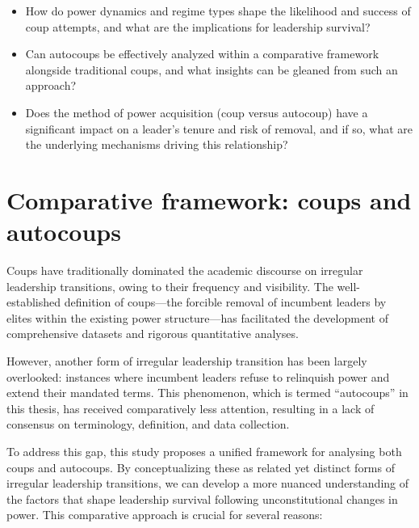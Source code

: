 \documentclass[
  12pt,
]{report}
\begin{document}
\begin{itemize}
\item
  How do power dynamics and regime types shape the likelihood and
  success of coup attempts, and what are the implications for leadership
  survival?
\item
  Can autocoups be effectively analyzed within a comparative framework
  alongside traditional coups, and what insights can be gleaned from
  such an approach?
\item
  Does the method of power acquisition (coup versus autocoup) have a
  significant impact on a leader's tenure and risk of removal, and if
  so, what are the underlying mechanisms driving this relationship?
\end{itemize}

\section{Comparative framework: coups and
autocoups}\label{comparative-framework-coups-and-autocoups}

Coups have traditionally dominated the academic discourse on irregular
leadership transitions, owing to their frequency and visibility. The
well-established definition of coups---the forcible removal of incumbent
leaders by elites within the existing power structure---has facilitated
the development of comprehensive datasets and rigorous quantitative
analyses.

However, another form of irregular leadership transition has been
largely overlooked: instances where incumbent leaders refuse to
relinquish power and extend their mandated terms. This phenomenon, which
is termed ``autocoups'' in this thesis, has received comparatively less
attention, resulting in a lack of consensus on terminology, definition,
and data collection.

To address this gap, this study proposes a unified framework for
analysing both coups and autocoups. By conceptualizing these as related
yet distinct forms of irregular leadership transitions, we can develop a
more nuanced understanding of the factors that shape leadership survival
following unconstitutional changes in power. This comparative approach
is crucial for several reasons:
\end{document}
